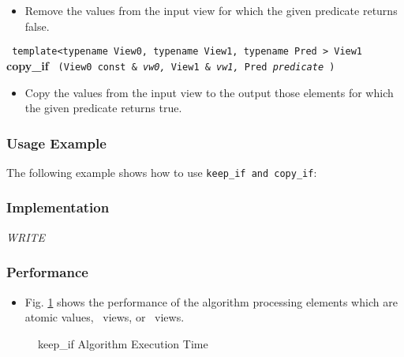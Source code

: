 \begin{itemize}
\item
Remove the values from the input view for which the given predicate returns false. 
\end{itemize}
 
\noindent
\texttt{%
template<typename View0, typename View1, typename Pred >
\newline
View1 
}
\newline
\textbf{copy\_if}%
\texttt{%
(View0 const \&
\textit{vw0,}%
View1 \&
\textit{vw1,}%
Pred 
\textit{predicate}%
)
}

\begin{itemize}
\item
Copy the values from the input view to the output those elements for which the given predicate returns true. 
\end{itemize}
 
\subsubsection{Usage Example} %

The following example shows how to use \texttt{keep\_if and copy\_if}:


\subsubsection{Implementation} %

\textit{WRITE}

\subsubsection{Performance} %

\begin{itemize}
\item
Fig. \ref{fig:keep-if-alg-exec-exper}
shows the performance of the algorithm processing
elements which are atomic values, \stl\ views, or \stapl\ views.
\end{itemize}

\begin{figure}[p]
\caption{keep\_if Algorithm Execution Time}
\label{fig:keep-if-alg-exec-exper}
\end{figure}

